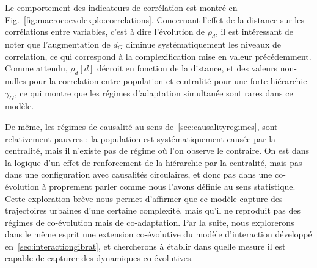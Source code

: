 Le comportement des indicateurs de corrélation est montré en Fig.~\ref{fig:macrocoevolexplo:correlations}. Concernant l'effet de la distance sur les corrélations entre variables, c'est à dire l'évolution de $\rho_d$, il est intéressant de noter que l'augmentation de $d_G$ diminue systématiquement les niveaux de correlation, ce qui correspond à la complexification mise en valeur précédemment. Comme attendu, $\rho_d\left[d\right]$ décroit en fonction de la distance, et des valeurs non-nulles pour la correlation entre population et centralité pour une forte hiérarchie $\gamma_G$, ce qui montre que les régimes d'adaptation simultanée sont rares dans ce modèle.


De même, les régimes de causalité au sens de~\ref{sec:causalityregimes}, sont relativement pauvres : la population est systématiquement causée par la centralité, mais il n'existe pas de régime où l'on observe le contraire. On est dans la logique d'un effet de renforcement de la hiérarchie par la centralité, mais pas dans une configuration avec causalités circulaires, et donc pas dans une co-évolution à proprement parler comme nous l'avons définie au sens statistique. Cette exploration brève nous permet d'affirmer que ce modèle capture des trajectoires urbaines d'une certaine complexité, mais qu'il ne reproduit pas des régimes de co-évolution mais de co-adaptation. Par la suite, nous explorerons dans le même esprit une extension co-évolutive du modèle d'interaction développé en~\ref{sec:interactiongibrat}, et chercherons à établir dans quelle mesure il est capable de capturer des dynamiques co-évolutives.








